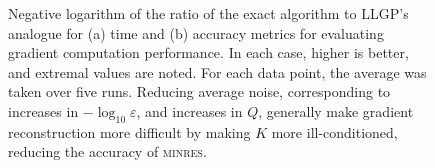 \documentclass{article}
\begin{document}
\begin{figure}[!h]
  \centering

 \caption{Negative logarithm of the ratio of the exact algorithm to LLGP's analogue for (a) time and (b) accuracy metrics for evaluating gradient computation performance. In each case, higher is better, and extremal values are noted.  For each data point, the average was taken over five runs. Reducing average noise, corresponding to increases in $-\log_{10}\varepsilon$, and increases in $Q$, generally make gradient reconstruction more difficult by making $K$ more ill-conditioned, reducing the accuracy of \textsc{minres}.}
\label{fig:rellog}
\end{figure}
\end{document}

